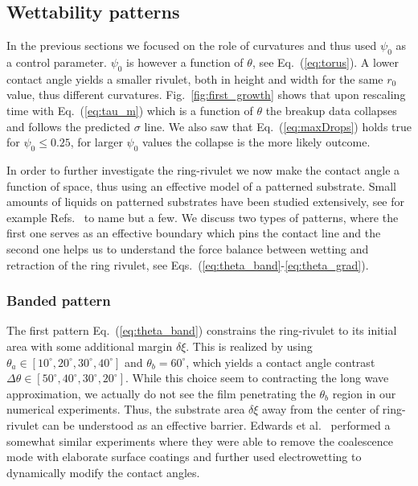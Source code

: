 \documentclass[twoside,twocolumn,9pt]{article}
\begin{document}
\subsection{Wettability patterns}\label{subsec:wettability}
In the previous sections we focused on the role of curvatures and thus used $\psi_0$ as a control parameter. 
$\psi_0$ is however a function of $\theta$, see Eq.~(\ref{eq:torus}).
A lower contact angle yields a smaller rivulet, both in height and width for the same $r_0$ value, thus different curvatures.
Fig.~\ref{fig:first_growth} shows that upon rescaling time with Eq.~(\ref{eq:tau_m}) which is a function of $\theta$ the breakup data collapses and follows the predicted $\sigma$ line.
We also saw that Eq.~(\ref{eq:maxDrops}) holds true for $\psi_0 \leq 0.25$, for larger $\psi_0$ values the collapse is the more likely outcome.

In order to further investigate the ring-rivulet we now make the contact angle a function of space, thus using an effective model of a patterned substrate. 
Small amounts of liquids on patterned substrates have been studied extensively, see for example Refs.~\cite{savvaDropletMotionInclined2013, vellingiriDropletSpreadingChemically2011, wangWettingEffectPatterned2023, wuInvestigationEquilibriumDroplet2019} to name but a few.
We discuss two types of patterns, where the first one serves as an effective boundary which pins the contact line and the second one helps us to understand the force balance between wetting and retraction of the ring rivulet, see Eqs.~(\ref{eq:theta_band}-\ref{eq:theta_grad}).

\subsubsection{Banded pattern}\label{subsubsec:banded}
The first pattern Eq.~(\ref{eq:theta_band}) constrains the ring-rivulet to its initial area with some additional margin $\delta\xi$.
This is realized by using $\theta_a \in [10^{\circ}, 20^{\circ}, 30^{\circ}, 40^{\circ}]$ and $\theta_b = 60^{\circ}$, which yields a contact angle contrast $\Delta\theta \in [50^{\circ}, 40^{\circ}, 30^{\circ}, 20^{\circ}]$.
While this choice seem to contracting the long wave approximation, we actually do not see the film penetrating the $\theta_b$ region in our numerical experiments.
Thus, the substrate area $\delta\xi$ away from the center of ring-rivulet can be understood as an effective barrier. 
Edwards et al.~\cite{edwardsControllingBreakupToroidal2021} performed a somewhat similar experiments where they were able to remove the coalescence mode with elaborate surface coatings and further used electrowetting to dynamically modify the contact angles.
\end{document}
